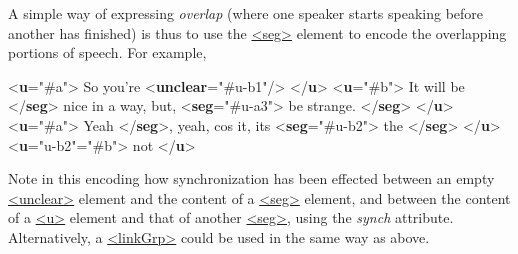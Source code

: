 A simple way of expressing \textit{overlap} (where one speaker starts speaking before another has finished) is thus to use the \hyperref[TEI.seg]{<seg>} element to encode the overlapping portions of speech. For example, \par\bgroup{}\exampleFont \begin{shaded}\noindent\mbox{}{<\textbf{u}\hspace*{1em}{who}="{\#a}">} So you're {<\textbf{unclear}\hspace*{1em}{synch}="{\#u-b1}"/>}\mbox{}\newline 
{</\textbf{u}>}\mbox{}\newline 
{<\textbf{u}\hspace*{1em}{who}="{\#b}">}\mbox{}\newline 
{} It will be {</\textbf{seg}>} nice in a way, but,\mbox{}\newline 
{<\textbf{seg}\hspace*{1em}{synch}="{\#u-a3}">} be strange. {</\textbf{seg}>}\mbox{}\newline 
{</\textbf{u}>}\mbox{}\newline 
{<\textbf{u}\hspace*{1em}{who}="{\#a}">}\mbox{}\newline 
{} Yeah {</\textbf{seg}>}, yeah, cos it,\mbox{}\newline 
 its {<\textbf{seg}\hspace*{1em}{synch}="{\#u-b2}">} the {</\textbf{seg}>}\mbox{}\newline 
{</\textbf{u}>}\mbox{}\newline 
{<\textbf{u}\hspace*{1em}{xml:id}="{u-b2}"\hspace*{1em}{who}="{\#b}">} not {</\textbf{u}>}\end{shaded}\egroup\par \noindent  Note in this encoding how synchronization has been effected between an empty \hyperref[TEI.unclear]{<unclear>} element and the content of a \hyperref[TEI.seg]{<seg>} element, and between the content of a \hyperref[TEI.u]{<u>} element and that of another \hyperref[TEI.seg]{<seg>}, using the {\itshape synch} attribute. Alternatively, a \hyperref[TEI.linkGrp]{<linkGrp>} could be used in the same way as above.
